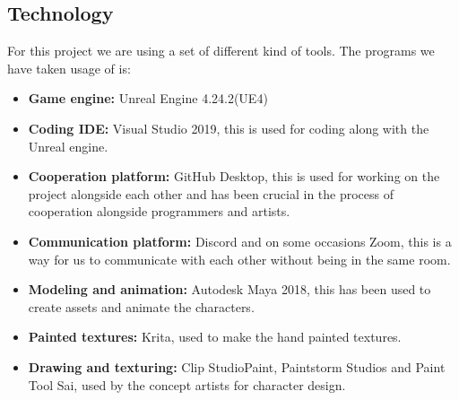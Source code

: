 \subsection{Technology}
\label{sec:Reasearch}
For this project we are using a set of different kind of tools. The programs we have taken usage of is:
\begin{itemize} 
\item \textbf{Game engine:} Unreal Engine 4.24.2(UE4)
\item \textbf{Coding IDE:} Visual Studio 2019, this is used for coding along with the Unreal engine.
\item \textbf{Cooperation platform:} GitHub Desktop, this is used for working on the project alongside each other and has been crucial in the process of cooperation alongside programmers and artists.
\item \textbf{Communication platform:} Discord and on some occasions Zoom, this is a way for us to communicate with each other without being in the same room.
\item \textbf{Modeling and animation:} Autodesk Maya 2018, this has been used to create assets and animate the characters.
\item \textbf{Painted textures:} Krita, used to make the hand painted textures.
\item \textbf{Drawing and texturing:} Clip StudioPaint, Paintstorm Studios and Paint Tool Sai, used by the concept artists for character design.
\end{itemize}

